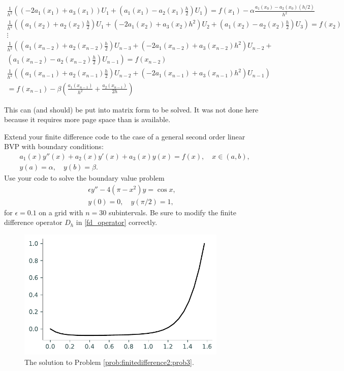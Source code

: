 \begin{gather*}
\frac{1}{h^2} \left((-2a_1(x_1) + a_3(x_1))U_1 + \left(a_1(x_1) - a_2(x_1)\frac{h}{2}\right)U_1 \right) = f(x_1) -\alpha\frac{a_1(x_0) - a_2(x_0)(h/2)}{h^2}\\
\frac{1}{h^2} \left(\left(a_1(x_2) + a_2(x_2)\frac{h}{2}\right) U_1 + (- 2a_1(x_2) + a_3(x_2)h^2)U_2 + \left(a_1(x_2) - a_2(x_2)\frac{h}{2} \right)U_3 \right) = f(x_2)\\
\vdots \\
\frac{1}{h^2} \left( \left(a_1(x_{n-2}) + a_2(x_{n-2})\frac{h}{2}\right) U_{n-3} + (- 2a_1(x_{n-2}) + a_3(x_{n-2})h^2)U_{n-2} + \right.\\
	\left. \left(a_1(x_{n-2}) - a_2(x_{n-2})\frac{h}{2} \right)U_{n-1} \right) = f(x_{n-2})\\
\frac{1}{h^2} \left( \left(a_1(x_{n-1}) + a_2(x_{n-1})\frac{h}{2}\right) U_{n-2} + (- 2a_1(x_{n-1}) + a_3(x_{n-1})h^2)U_{n-1} \right)\\
= f(x_{n-1}) - \beta\left(\frac{a_1(x_{n-1})}{h^2}+ \frac{a_2(x_{n-1})}{2h}\right)
\end{gather*}

This can (and should) be put into matrix form to be solved. It was not done here because it requires more page space than is available.

\begin{problem}
Extend your finite difference code to the case of a general second order linear BVP with boundary conditions:
\begin{align*}
	&{ } a_1(x)y''(x) +a_2(x)y'(x)+ a_3(x) y(x) = f(x), \quad x \in (a,b),\\
	&{ } y(a) = \alpha, \quad y(b) = \beta.
\end{align*}
Use your code to solve the boundary value problem
\begin{align*}
	\epsilon y'' - 4(\pi - x^2)y = \cos x, \\
	y(0) = 0, \quad y(\pi/2) = 1,
\end{align*}
for $\epsilon = 0.1$ on a grid with $n=30$ subintervals.
\label{prob:finitedifference2:prob3}
Be sure to modify the finite difference operator $D_h$ in \eqref{fd_operator} correctly.

\end{problem}



\begin{figure}[h]
\centering
\includegraphics[width=10cm]{figures/figure3.pdf}
\caption{The solution to Problem \ref{prob:finitedifference2:prob3}.
}
\end{figure}



